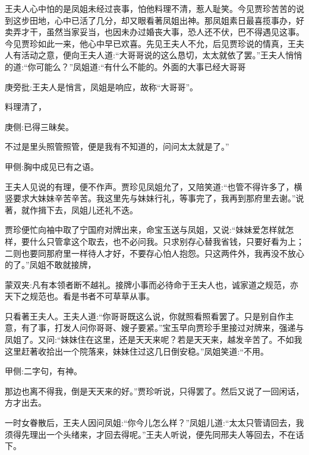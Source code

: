 \begin{parag}
    王夫人心中怕的是凤姐未经过丧事，怕他料理不清，惹人耻笑。今见贾珍苦苦的说到这步田地，心中已活了几分，却又眼看著凤姐出神。那凤姐素日最喜揽事办，好卖弄才干，虽然当家妥当，也因未办过婚丧大事，恐人还不伏，巴不得遇见这事。今见贾珍如此一来，他心中早已欢喜。先见王夫人不允，后见贾珍说的情真，王夫人有活动之意，便向王夫人道:“大哥哥说的这么恳切，太太就依了罢。”王夫人悄悄的道:“你可能么？”凤姐道:“有什么不能的。外面的大事已经大哥哥\begin{note}庚旁批:王夫人是悄言，凤姐是响应，故称“大哥哥”。\end{note}料理清了，\begin{note}庚侧:已得三昧矣。\end{note}不过是里头照管照管，便是我有不知道的，问问太太就是了。”\begin{note}甲侧:胸中成见已有之语。\end{note}王夫人见说的有理，便不作声。贾珍见凤姐允了，又陪笑道:“也管不得许多了，横竖要求大妹妹辛苦辛苦。我这里先与妹妹行礼，等事完了，我再到那府里去谢。”说著，就作揖下去，凤姐儿还礼不迭。
\end{parag}


\begin{parag}
    贾珍便忙向袖中取了宁国府对牌出来，命宝玉送与凤姐，又说:“妹妹爱怎样就怎样，要什么只管拿这个取去，也不必问我。只求别存心替我省钱，只要好看为上；二则也要同那府里一样待人才好，不要存心怕人抱怨。只这两件外，我再没不放心的了。”凤姐不敢就接牌，\begin{note}蒙双夹:凡有本领者断不越礼。接牌小事而必待命于王夫人也，诚家道之规范，亦天下之规范也。看是书者不可草草从事。\end{note}只看著王夫人。王夫人道:“你哥哥既这么说，你就照看照看罢了。只是别自作主意，有了事，打发人问你哥哥、嫂子要紧。”宝玉早向贾珍手里接过对牌来，强递与凤姐了。又问:“妹妹住在这里，还是天天来呢？若是天天来，越发辛苦了。不如我这里赶著收拾出一个院落来，妹妹住过这几日倒安稳。”凤姐笑道:“不用。\begin{note}甲侧:二字句，有神。\end{note}那边也离不得我，倒是天天来的好。”贾珍听说，只得罢了。然后又说了一回闲话，方才出去。
\end{parag}


\begin{parag}
    一时女眷散后，王夫人因问凤姐:“你今儿怎么样？”凤姐儿道:“太太只管请回去，我须得先理出一个头绪来，才回去得呢。”王夫人听说，便先同邢夫人等回去，不在话下。
\end{parag}


